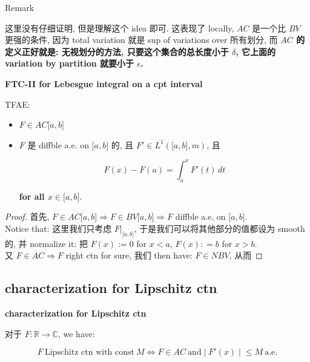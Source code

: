 \documentclass{qlnotes-export}
\begin{document}
\begin{qlremark}{Remark}

这里没有仔细证明, 但是理解这个 idea 即可. 这表现了 locally, \(AC\) 是一个比 \(BV\) 更强的条件, 因为 total variation 就是 sup of variations over 所有划分, 而 \textbf{\(AC\) 的定义正好就是: 无视划分的方法, 只要这个集合的总长度小于 \(\delta\), 它上面的 variation by partition 就要小于 \(\epsilon\).}

\end{qlremark}

\begin{theorem}{\protect{}\label{kn-ftc-ii-for-lebesgue-integral-on-a-cpt-interval}{\textbf{FTC-II
for Lebesgue integral on a cpt interval}}}

TFAE:

\begin{itemize}
\item
  \(F \in AC\lbrack a,b\rbrack\)
\item
  \(F\) 是 diffble a.e. on \(\lbrack a,b\rbrack\) 的, 且 \(F' \in L^{1}(\lbrack a,b\rbrack,m)\), 且

  \[F(x) - F(a) = \int_{a}^{x}F'(t)\, dt\]

  \textbf{for all \(x \in \lbrack a,b\rbrack\)}.
\end{itemize}

\end{theorem}

\begin{proof}

首先, \(F \in AC\lbrack a,b\rbrack\Longrightarrow F \in BV\lbrack a,b\rbrack\Longrightarrow F\) diffble a.e. on \(\lbrack a,b\rbrack\).\\
Notice that: 这里我们只考虑 \(F|_{\lbrack a,b\rbrack}\), 于是我们可以将其他部分的值都设为 smooth 的, 并 normalize it: 把 \(F(x) := 0\) for \(x < a\), \(F(x): = b\) for \(x > b\).\\
又 \(F \in AC\Longrightarrow F\) right ctn for sure, 我们 then have: \(F \in NBV\), 从而

\end{proof}

\subsection{characterization for Lipschitz ctn}\label{characterization-for-lipschitz-ctn}

\begin{theorem}{\protect{}\label{kn-characterization-for-lipschitz-ctn}{\textbf{characterization
for Lipschitz ctn}}}

对于 \(F:{\mathbb{R}}\rightarrow{\mathbb{C}}\), we have:

\[\left. F\ \text{Lipschitz ctn with const}\ M\Leftrightarrow F \in AC\ \text{and} \middle| F'(x) \middle| \leq M\ \text{a.e.} \right.\]

\end{theorem}
\end{document}
